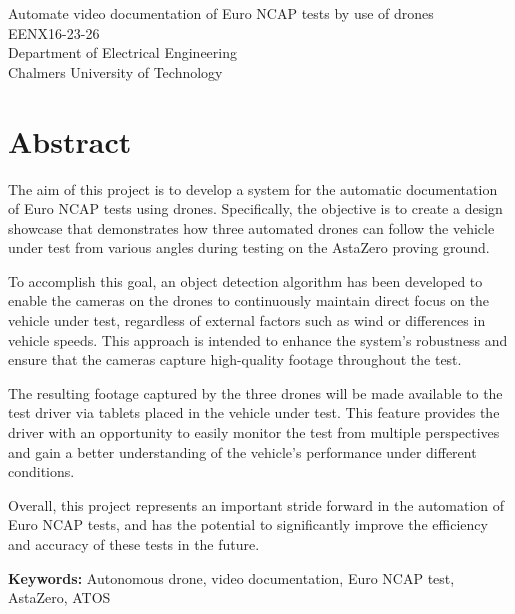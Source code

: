 Automate video documentation of Euro NCAP tests by use of drones\\
EENX16-23-26\\
Department of Electrical Engineering\\
Chalmers University of Technology \setlength{\parskip}{0.5cm}

\thispagestyle{plain}			%
\setlength{\parskip}{0pt plus 1.0pt}
\section*{Abstract}
The aim of this project is to develop a system for the automatic documentation of Euro NCAP tests using drones. Specifically, the objective is to create a design showcase that demonstrates how three automated drones can follow the vehicle under test from various angles during testing on the AstaZero proving ground.

To accomplish this goal, an object detection algorithm has been developed to enable the cameras on the drones to continuously maintain direct focus on the vehicle under test, regardless of external factors such as wind or differences in vehicle speeds. This approach is intended to enhance the system's robustness and ensure that the cameras capture high-quality footage throughout the test.

The resulting footage captured by the three drones will be made available to the test driver via tablets placed in the vehicle under test. This feature provides the driver with an opportunity to easily monitor the test from multiple perspectives and gain a better understanding of the vehicle's performance under different conditions.

Overall, this project represents an important stride forward in the automation of Euro NCAP tests, and has the potential to significantly improve the efficiency and accuracy of these tests in the future.

\vfill
\textbf{Keywords:} Autonomous drone, video documentation, Euro NCAP test, AstaZero, ATOS

\thispagestyle{empty}
\mbox{}
